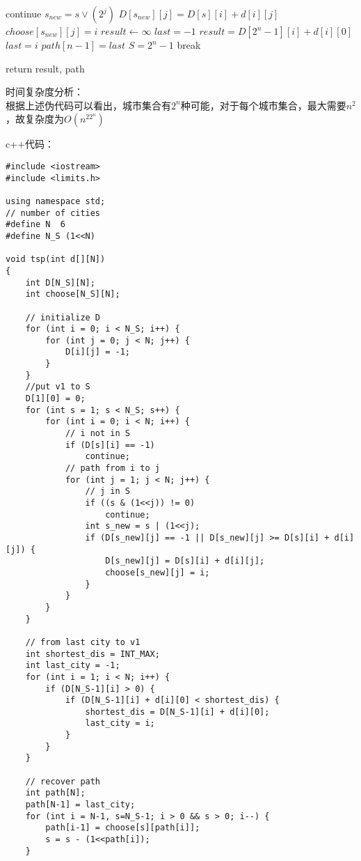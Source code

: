 \documentclass{article}
\begin{document}
\begin{enumerate}
\begin{algorithm}[H]
\begin{algorithmic}
						\STATE continue
						\ENDIF
						\STATE $s_{new}=s\lor (2^j)$
						\STATE $D[s_{new}][j]= D[s][i]+d[i][j]$
						\STATE $choose[s_{new}][j]=i$
						\ENDIF
						\ENDFOR
					\ENDFOR
				\ENDFOR
				\STATE $result \gets \infty$
				\STATE $last=-1$
				\STATE $result=D[2^n-1][i]+d[i][0]$
				\STATE $last=i$
				\ENDIF
				\ENDIF
				\ENDFOR
				\STATE $path[n-1]=last$
				\STATE $S=2^n-1$
				\STATE break
				\ENDIF
				\ENDFOR
				
				\STATE return result, path
			\end{algorithmic}
		
		\end{algorithm}
	

		
		时间复杂度分析：\\
		根据上述伪代码可以看出，城市集合有$2^n$种可能，对于每个城市集合，最大需要$n^2$，故复杂度为$O(n^22^n)$
		
		


c++代码：
\begin{lstlisting}
#include <iostream>
#include <limits.h>

using namespace std;
// number of cities
#define N  6
#define N_S (1<<N)

void tsp(int d[][N])
{
	int D[N_S][N];
	int choose[N_S][N];
	
	// initialize D
	for (int i = 0; i < N_S; i++) {
		for (int j = 0; j < N; j++) {
			D[i][j] = -1;
		}
	}
	//put v1 to S
	D[1][0] = 0;
	for (int s = 1; s < N_S; s++) {
		for (int i = 0; i < N; i++) {
			// i not in S
			if (D[s][i] == -1)
				continue;
			// path from i to j
			for (int j = 1; j < N; j++) {
				// j in S
				if ((s & (1<<j)) != 0)
					continue;
				int s_new = s | (1<<j);
				if (D[s_new][j] == -1 || D[s_new][j] >= D[s][i] + d[i][j]) {
					D[s_new][j] = D[s][i] + d[i][j];
					choose[s_new][j] = i;
				}
			}
		}
	}
	
	// from last city to v1
	int shortest_dis = INT_MAX;
	int last_city = -1;
	for (int i = 1; i < N; i++) {
		if (D[N_S-1][i] > 0) {
			if (D[N_S-1][i] + d[i][0] < shortest_dis) {
				shortest_dis = D[N_S-1][i] + d[i][0];
				last_city = i;
			}
		}
	}

	// recover path
	int path[N];
	path[N-1] = last_city;
	for (int i = N-1, s=N_S-1; i > 0 && s > 0; i--) {
		path[i-1] = choose[s][path[i]];
		s = s - (1<<path[i]);
	}


\end{lstlisting}
\end{enumerate}
\end{document}
